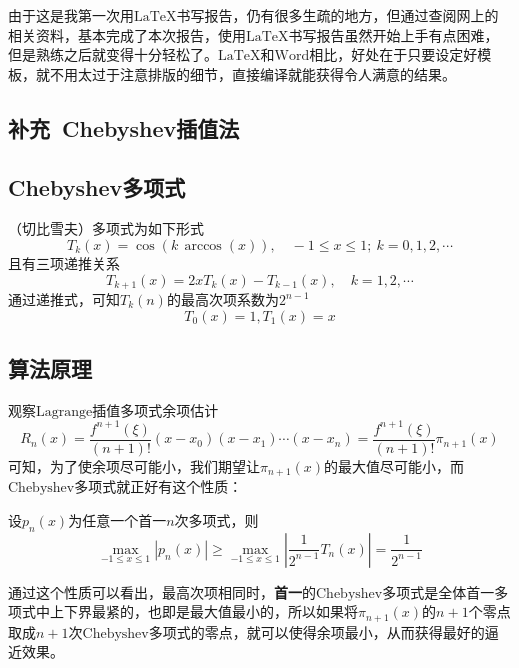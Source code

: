 \documentclass[12pt, a4paper, oneside]{ctexart}
\begin{document}
由于这是我第一次用$\text{LaTeX}$书写报告，仍有很多生疏的地方，但通过查阅网上的相关资料，基本完成了本次报告，使用$\text{LaTeX}$书写报告虽然开始上手有点困难，但是熟练之后就变得十分轻松了。$\text{LaTeX}$和$\text{Word}$相比，好处在于只要设定好模板，就不用太过于注意排版的细节，直接编译就能获得令人满意的结果。
\newpage
\begin{appendices}
\section{补充\ Chebyshev插值法}\label{sec:buchong}
\subsection{Chebyshev多项式}
（切比雪夫）多项式为如下形式
\begin{equation*}
    T_k(x)=\cos(k\, \arccos(x)),\quad -1\leqslant x\leqslant 1;\ k=0,1,2,\cdots
\end{equation*}
且有三项递推关系
\begin{equation*}
    T_{k+1}(x) = 2xT_k(x)-T_{k-1}(x),\quad k=1,2,\cdots
\end{equation*}
通过递推式，可知$T_k(n)$的最高次项系数为$2^{n-1}$
\begin{equation*}
    T_0(x) = 1, T_1(x) = x
\end{equation*}

\subsection{算法原理}
观察$\text{Lagrange}$插值多项式余项估计
\begin{equation*}
    R_n(x) = \frac{f^{n+1}(\xi)}{(n+1)!}(x-x_0)(x-x_1)\cdots(x-x_n) = \frac{f^{n+1}(\xi)}{(n+1)!}\pi_{n+1}(x)
\end{equation*}
可知，为了使余项尽可能小，我们期望让$\pi_{n+1}(x)$的最大值尽可能小，而$\text{Chebyshev}$多项式就正好有这个性质：

\begin{property}
    设$p_n(x)$为任意一个首一$n$次多项式，则
    \begin{equation*}
        \max_{-1\leqslant x\leqslant 1}|p_n(x)|\geqslant \max_{-1\leqslant x\leqslant 1}\left|\frac{1}{2^{n-1}}T_n(x)\right|=\frac{1}{2^{n-1}}
    \end{equation*}
\end{property}

通过这个性质可以看出，最高次项相同时，\textbf{首一}的$\text{Chebyshev}$多项式是全体首一多项式中上下界最紧的，也即是最大值最小的，所以如果将$\pi_{n+1}(x)$的$n+1$个零点取成$n+1$次$\text{Chebyshev}$多项式的零点，就可以使得余项最小，从而获得最好的逼近效果。


\end{appendices}
\end{document}
